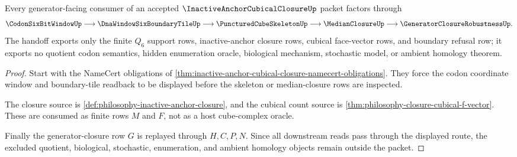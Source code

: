 \begin{theorem}
\label{thm:inactive-anchor-cubical-closure-generator-handoff}
Every generator-facing consumer of an accepted $\InactiveAnchorCubicalClosureUp$ packet factors through
$$
\CodonSixBitWindowUp \longrightarrow \DnaWindowSixBoundaryTileUp \longrightarrow \PuncturedCubeSkeletonUp \longrightarrow \MedianClosureUp \longrightarrow \GeneratorClosureRobustnessUp .
$$
The handoff exports only the finite $Q_{6}$ support rows, inactive-anchor closure rows, cubical face-vector rows, and boundary refusal row; it exports no quotient codon semantics, hidden enumeration oracle, biological mechanism, stochastic model, or ambient homology theorem.
\end{theorem}
\begin{proof}
Start with the NameCert obligations of \autoref{thm:inactive-anchor-cubical-closure-namecert-obligations}. They force the codon coordinate window and boundary-tile readback to be displayed before the skeleton or median-closure rows are inspected.

The closure source is \autoref{def:philosophy-inactive-anchor-closure}, and the cubical count source is \autoref{thm:philosophy-closure-cubical-f-vector}. These are consumed as finite rows $M$ and $F$, not as a host cube-complex oracle.

Finally the generator-closure row $G$ is replayed through $H,C,P,N$. Since all downstream reads pass through the displayed route, the excluded quotient, biological, stochastic, enumeration, and ambient homology objects remain outside the packet.
\end{proof}



